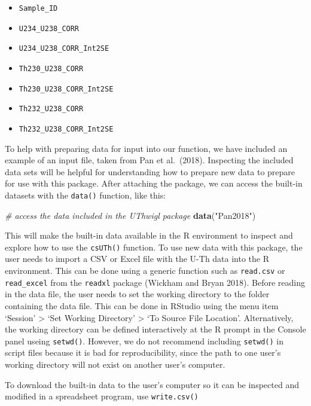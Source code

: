 \documentclass[]{elsarticle} %
\providecommand{\tightlist}{%
  \setlength{\itemsep}{0pt}\setlength{\parskip}{0pt}}
\newenvironment{Shaded}{\begin{snugshade}}{\end{snugshade}}
\newcommand{\CommentTok}[1]{\textcolor[rgb]{0.56,0.35,0.01}{\textit{#1}}}
\newcommand{\KeywordTok}[1]{\textcolor[rgb]{0.13,0.29,0.53}{\textbf{#1}}}
\newcommand{\NormalTok}[1]{#1}
\newcommand{\StringTok}[1]{\textcolor[rgb]{0.31,0.60,0.02}{#1}}
\begin{document}
\begin{itemize}
\tightlist
\item
  \texttt{Sample\_ID}
\item
  \texttt{U234\_U238\_CORR}
\item
  \texttt{U234\_U238\_CORR\_Int2SE}
\item
  \texttt{Th230\_U238\_CORR}
\item
  \texttt{Th230\_U238\_CORR\_Int2SE}
\item
  \texttt{Th232\_U238\_CORR}
\item
  \texttt{Th232\_U238\_CORR\_Int2SE}
\end{itemize}

To help with preparing data for input into our function, we have included an example of an input file, taken from Pan et al.~(2018). Inspecting the included data sets will be helpful for understanding how to prepare new data to prepare for use with this package. After attaching the package, we can access the built-in datasets with the \texttt{data()} function, like this:

\begin{Shaded}
\begin{Highlighting}[]
\CommentTok{# access the data included in the UThwigl package}
\KeywordTok{data}\NormalTok{(}\StringTok{"Pan2018"}\NormalTok{)}
\end{Highlighting}
\end{Shaded}

This will make the built-in data available in the R environment to inspect and explore how to use the \texttt{csUTh()} function. To use new data with this package, the user needs to import a CSV or Excel file with the U-Th data into the R environment. This can be done using a generic function such as \texttt{read.csv} or \texttt{read\_excel} from the \texttt{readxl} package (Wickham and Bryan 2018). Before reading in the data file, the user needs to set the working directory to the folder containing the data file. This can be done in RStudio using the menu item `Session' \textgreater{} `Set Working Directory' \textgreater{} `To Source File Location'. Alternatively, the working directory can be defined interactively at the R prompt in the Console panel useing \texttt{setwd()}. However, we do not recommend including \texttt{setwd()} in script files because it is bad for reproducibility, since the path to one user's working directory will not exist on another user's computer.

To download the built-in data to the user's computer so it can be inspected and modified in a spreadsheet program, use \texttt{write.csv()}
\end{document}

